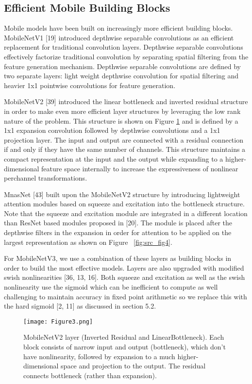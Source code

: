 \subsection{Efficient Mobile Building Blocks}

Mobile models have been built on increasingly more efficient building blocks. MobileNetV1 [19] introduced depthwise
separable convolutions as an efficient replacement for traditional convolution layers. Depthwise separable convolutions
effectively factorize traditional convolution by separating spatial filtering from the feature generation mechanism.
Depthwise separable convolutions are defined by two separate layers: light weight depthwise convolution for
spatial filtering and heavier 1x1 pointwise convolutions for feature generation.

MobileNetV2 [39] introduced the linear bottleneck and inverted residual structure in order to make even more efficient
layer structures by leveraging the low rank nature of the problem. This structure is shown on Figure \ref{fig:src_fig3} and is
defined by a 1x1 expansion convolution followed by depthwise convolutions and a 1x1 projection layer. The input and
output are connected with a residual connection if and only if they have the same number of channels. This structure
maintains a compact representation at the input and the output while expanding to a higher-dimensional feature space
internally to increase the expressiveness of nonlinear perchannel transformations.

MnasNet [43] built upon the MobileNetV2 structure by introducing lightweight attention modules based on squeeze
and excitation into the bottleneck structure. Note that the squeeze and excitation module are integrated in a different
location than ResNet based modules proposed in [20]. The module is placed after the depthwise filters in the expansion
in order for attention to be applied on the largest representation as shown on Figure ~\ref{fig:src_fig4}.

For MobileNetV3, we use a combination of these layers as building blocks in order to build the most effective models.
Layers are also upgraded with modified swish nonlinearities [36, 13, 16]. Both squeeze and excitation as well as
the swish nonlinearity use the sigmoid which can be inefficient to compute as well challenging to maintain accuracy
in fixed point arithmetic so we replace this with the hard sigmoid [2, 11] as discussed in section 5.2.

\begin{figure}[!htbp]
    \centering
    \texttt{[image: Figure3.png]}
    \caption{MobileNetV2 layer (Inverted Residual and LinearBottleneck). Each block consists of narrow input and output (bottleneck),
    which don’t have nonlinearity, followed by expansion to a much higher-dimensional space and projection to the output. The
    residual connects bottleneck (rather than expansion).}
    \label{fig:src_fig3}
\end{figure}


